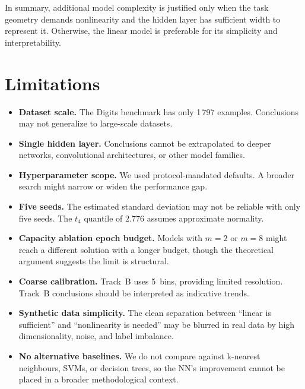 \documentclass[11pt]{article}
\begin{document}
In summary, additional model complexity is justified only when the task geometry demands nonlinearity and the hidden layer has sufficient width to represent it. Otherwise, the linear model is preferable for its simplicity and interpretability.

\section{Limitations}
\label{sec:limitations}

\begin{itemize}[leftmargin=1.5em]
  \item \textbf{Dataset scale.}
    The Digits benchmark has only 1\,797 examples.
    Conclusions may not generalize to large-scale datasets.

  \item \textbf{Single hidden layer.}
    Conclusions cannot be extrapolated to deeper networks, convolutional
    architectures, or other model families.

  \item \textbf{Hyperparameter scope.}
    We used protocol-mandated defaults.
    A broader search might narrow or widen the performance gap.

  \item \textbf{Five seeds.}
    The estimated standard deviation may not be reliable with only five seeds.
    The $t_4$ quantile of $2.776$ assumes approximate normality.

  \item \textbf{Capacity ablation epoch budget.}
    Models with $m=2$ or $m=8$ might reach a different solution with a
    longer budget, though the theoretical argument suggests the limit is
    structural.

  \item \textbf{Coarse calibration.}
    Track~B uses 5~bins, providing limited resolution.
    Track~B conclusions should be interpreted as indicative trends.

  \item \textbf{Synthetic data simplicity.}
    The clean separation between ``linear is sufficient'' and ``nonlinearity
    is needed'' may be blurred in real data by high dimensionality, noise,
    and label imbalance.

  \item \textbf{No alternative baselines.}
    We do not compare against k-nearest neighbours, SVMs, or decision trees,
    so the NN's improvement cannot be placed in a broader methodological
    context.
\end{itemize}
\end{document}

